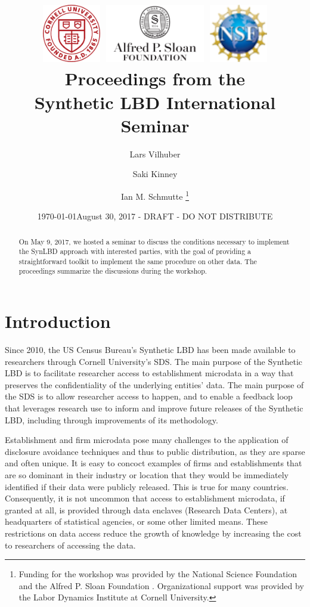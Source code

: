 \documentclass[letterpaper,12pt]{article}
\title{\includegraphics[height=1in]{cornell.png}
	\includegraphics[height=1in]{sloan.png}
	\includegraphics[height=1in]{nsf.png}
	\\
	Proceedings from the\\Synthetic LBD International Seminar}
\author{Lars Vilhuber \and Saki Kinney \and Ian M. Schmutte \thanks{Funding for the workshop was provided by the National Science Foundation \citepalias[Grants][]{nsf1012593,nsf1131848} and the Alfred P. Sloan Foundation \citepalias{sloan2015}. Organizational support was provided by the Labor Dynamics Institute at Cornell University. }}
\date{\today}
\date{August 30, 2017 - DRAFT - DO NOT DISTRIBUTE}
\begin{document}

\maketitle

\begin{abstract}
On May 9, 2017, we hosted a seminar to discuss the conditions necessary to implement the SynLBD approach with interested parties, with the goal of providing  a straightforward toolkit to implement the same procedure on other data. The proceedings summarize the discussions during the workshop.
\end{abstract}

\newpage
\section{Introduction}
Since 2010, the US Census Bureau's Synthetic LBD \citep{KinneyEtAl2011} has been made available to researchers through Cornell University’s \ac{SDS}. The main purpose of the Synthetic LBD is to facilitate researcher access to establishment microdata in a way that preserves the confidentiality of the underlying entities' data. The main purpose of the \ac{SDS} is to allow  researcher access to happen, and to enable a feedback loop that leverages research use to inform and improve future releases of the Synthetic LBD, including through improvements of its methodology.

Establishment and firm microdata pose many challenges to the application of disclosure avoidance techniques and thus to public distribution, as they are sparse and often unique. It is easy to concoct examples of firms and establishments that are so dominant in their industry or location that they would be immediately identified if their data were publicly released. This is true for many countries. Consequently, it is not uncommon that access to establishment microdata, if granted at all, is provided through data enclaves (Research Data Centers), at headquarters of statistical agencies, or some other limited means. These restrictions on data access reduce the growth of knowledge by increasing the cost to researchers of accessing the data.
\end{document}

